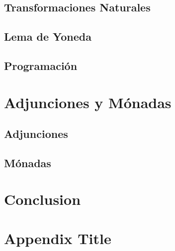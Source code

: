 \documentclass[12pt]{report}
\begin{document}
\section{Transformaciones Naturales}

\section{Lema de Yoneda}

\section{Programación}

\chapter{Adjunciones y Mónadas}
\section{Adjunciones}


\section{Mónadas}


\chapter{Conclusion}

\printbibliography

\appendix
\chapter{Appendix Title}
\end{document}
